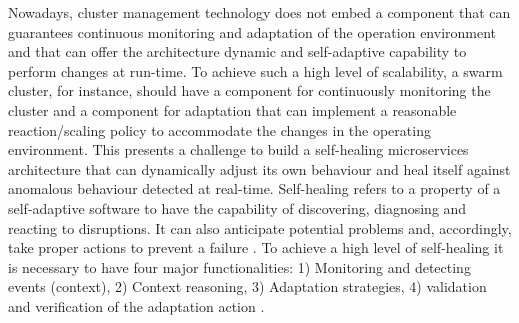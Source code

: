 \documentclass[sigconf]{acmart}
\begin{document}
Nowadays, cluster management technology does not embed a component that can guarantees continuous monitoring and adaptation of the operation environment and that can offer the architecture dynamic and self-adaptive capability to perform  changes at run-time.  To achieve such a high level of scalability, a swarm cluster, for instance, should have a component for continuously monitoring the cluster and a component for adaptation that can implement a reasonable reaction/scaling policy to accommodate the changes in the operating environment. This presents a challenge to build a self-healing microservices architecture that can dynamically adjust its own behaviour and heal itself against anomalous behaviour detected at real-time. Self-healing refers to a property of a self-adaptive software to have the capability of discovering, diagnosing and reacting to disruptions. It can also anticipate potential problems and, accordingly, take proper actions to prevent a failure \cite{Salehie:2009p3693}. To achieve a high level of  self-healing it is necessary to have four major functionalities: 1)  Monitoring and detecting events (context), 2) Context reasoning, 3) Adaptation strategies, 4) validation and verification of the adaptation action \cite{Kapitsaki:2009p3694}.  

\end{document}
